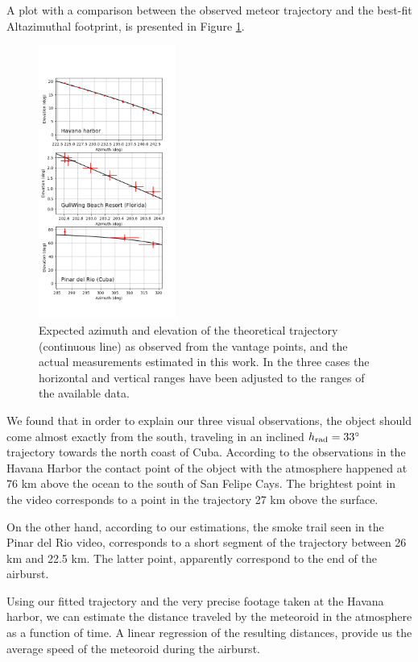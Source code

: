 \documentclass[fleqn,usenatbib]{mnras}
\begin{document}
A plot with a comparison between the observed meteor trajectory and the best-fit Altazimuthal footprint, is presented in Figure \ref{fig:fit}.

\begin{figure}  
  \centering
  \includegraphics[width=0.4\textwidth]{trajectory-fit.png}
\caption{Expected azimuth and elevation of the theoretical trajectory (continuous line) as observed from the vantage points, and the actual measurements estimated in this work.  In the three cases the horizontal and vertical ranges have been adjusted to the ranges of the available data.\label{fig:fit}}
\end{figure}

We found that in order to explain our three visual observations, the object should come almost exactly from the south, traveling in an inclined $h_{\rm rad}=33^\circ$ trajectory towards the north coast of Cuba.  According to the observations in the Havana Harbor the contact point of the object with the atmosphere happened at 76 km above the ocean to the south of San Felipe Cays.  The brightest point in the video corresponds to a point in the trajectory 27 km obove the surface.  

On the other hand, according to our estimations, the smoke trail seen in the Pinar del Rio video, corresponds to a short segment of the trajectory between 26 km and 22.5 km.  The latter point, apparently correspond to the end of the airburst. 

Using our fitted trajectory and the very precise footage taken at the Havana harbor, we can estimate the distance traveled by the meteoroid in the atmosphere as a function of time.  A linear regression of the resulting distances, provide us the average speed of the meteoroid during the airburst.
\end{document}
